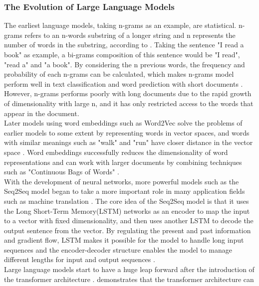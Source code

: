 \documentclass[runningheads]{llncs}
\begin{document}
\subsubsection{The Evolution of Large Language Models}  
\noindent \newline 
The earliest language models, taking n-grams as an example, are statistical. n-grams refers to an n-words substring of a longer string and n represents the number of words in the substring, according to \cite{Cavnar94}.
Taking the sentence "I read a book" as example, a bi-grams composition of this sentence would be "I read", "read a" and "a book". By considering the n previous words, the frequency and probability of each
n-grams can be calculated, which makes n-grams model perform well in text classification and word prediction with short documents \cite{Cavnar94}. 
However, n-grams performs poorly with long documents due to the rapid growth of dimensionality with large n, and it has only restricted access to the words that appear in the document.\\
\noindent \newline
Later models using word embeddings such as Word2Vec solve the problems of earlier models to some extent by representing words in vector spaces, and words with similar meanings such as "walk" and "run" have closer distance
in the vector space \cite{Mikolov13}. Word embeddings successfully reduces the dimensionality of word representations and can work with larger documents by combining techniques such as "Continuous Bags of Words" \cite{Mikolov13}. \\   
\noindent \newline
With the development of neural networks, more powerful models such as the Seq2Seq model began to take a more important role in many application fields such as
machine translation \cite{Sutskever14}. The core idea of the Seq2Seq model is that it uses the Long Short-Term Memory(LSTM) networks as an encoder to map the input to a vector with fixed dimensionality, and then
uses another LSTM to decode the output sentence from the vector. By regulating the present and past information and gradient flow, LSTM makes it possible for the model to handle long input sequences and the encoder-decoder structure enables the model 
to manage different lengths for input and output sequences \cite{Sutskever14}. \\
\noindent \newline
Large language models start to have a huge leap forward after the introduction of the transformer architecture \cite{Vaswani17}. \cite{Radford18} demonstrates that the transformer architecture can
\end{document}
